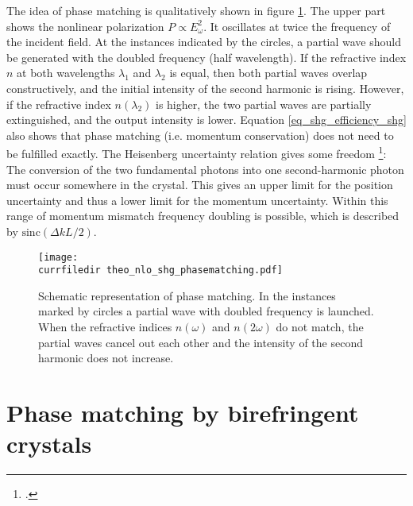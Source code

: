 The idea of phase matching is qualitatively shown in figure
\ref{fig_shg_phase_matching}. The upper part shows the nonlinear 
polarization $P \propto E_{\omega}^2$. It oscillates
at twice the frequency of the incident field. At the instances indicated by the circles,  a partial wave should  be generated with
the doubled frequency (half wavelength). If the
refractive index $n$ at both wavelengths $\lambda_1$ and
$\lambda_2$ is equal, then both partial waves overlap
constructively, and the initial intensity of the second harmonic
is rising. However, if the refractive index $n(\lambda_2)$ is higher,
the two partial waves are partially extinguished, and the
output intensity is lower. Equation
\ref{eq_shg_efficiency_shg} also shows that 
phase matching (i.e. momentum conservation) does not need to be fulfilled  exactly.  The Heisenberg uncertainty relation gives some freedom
\footcite{Demtroeder_laser,SalehTeich1991}:
The conversion of the two fundamental photons into one second-harmonic photon 
must occur somewhere in the crystal. This gives an upper limit for  the position uncertainty and thus a lower limit for the momentum uncertainty.
Within  this  range of momentum mismatch frequency doubling  is possible, which is described by $\text{sinc}(\Delta k L/2)$.




\begin{figure}
\center
\texttt{[image: \\currfiledir theo\_nlo\_shg\_phasematching.pdf]}
\caption{Schematic representation of 
phase matching.
In the instances marked by circles a
partial wave with doubled frequency is launched. When the
refractive indices $n(\omega)$ and $n(2 \omega)$ do not
match, the partial waves cancel out each other  and
the intensity of the second harmonic does not increase.}
\label{fig_shg_phase_matching}
\end{figure}


\section{Phase matching by birefringent crystals}



